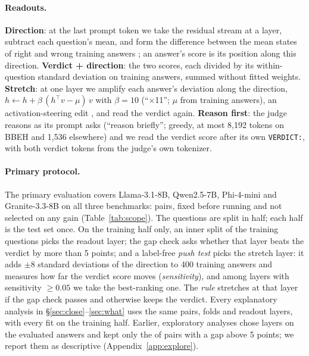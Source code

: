 \documentclass[11pt]{article}
\begin{document}
\paragraph{Readouts.} \textbf{Direction}: at the last prompt token we take the residual stream at a layer, subtract each question's mean, and form the difference between the mean states of right and wrong training answers \citep{marks2024geometry}; an answer's score is its position along this direction. \textbf{Verdict + direction}: the two scores, each divided by its within-question standard deviation on training answers, summed without fitted weights. \textbf{Stretch}: at one layer we amplify each answer's deviation along the direction, $h \leftarrow h + \beta\,(h^\top v - \mu)\,v$ with $\beta=10$ (``$\times$11''; $\mu$ from training answers), an activation-steering edit \citep{turner2023steering,li2023iti}, and read the verdict again. \textbf{Reason first}: the judge reasons as its prompt asks (``reason briefly''; greedy, at most 8,192 tokens on BBEH and 1,536 elsewhere) and we read the verdict score after its own \texttt{VERDICT:}, with both verdict tokens from the judge's own tokenizer.

\paragraph{Primary protocol.} The primary evaluation covers Llama-3.1-8B, Qwen2.5-7B, Phi-4-mini and Granite-3.3-8B on all three benchmarks:  pairs, fixed before running and not selected on any gain (Table~\ref{tab:scope}). The questions are split in half; each half is the test set once. On the training half only, an inner split of the training questions picks the readout layer; the gap check asks whether that layer beats the verdict by more than 5 points; and a label-free \emph{push test} picks the stretch layer: it adds $\pm8$ standard deviations of the direction to 400 training answers and measures how far the verdict score moves (\emph{sensitivity}), and among layers with sensitivity $\ge 0.05$ we take the best-ranking one. The \emph{rule} stretches at that layer if the gap check passes and otherwise keeps the verdict. Every explanatory analysis in \S\ref{sec:close}--\ref{sec:what} uses the same pairs, folds and readout layers, with every fit on the training half. Earlier, exploratory analyses chose layers on the evaluated answers and kept only the  of  pairs with a gap above 5 points; we report them as descriptive (Appendix~\ref{app:explore}).
\end{document}
